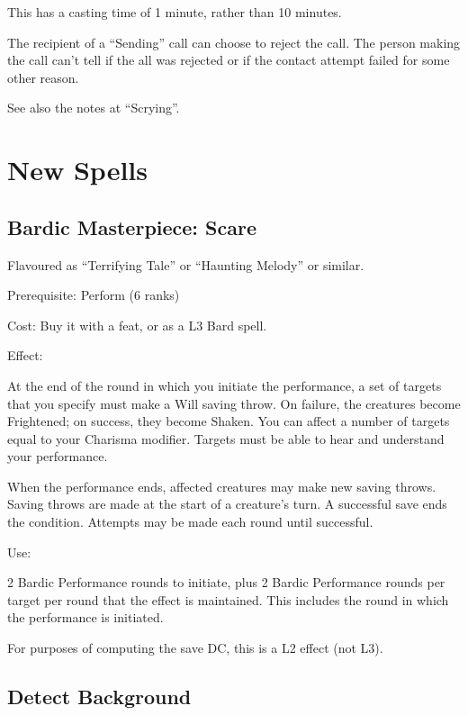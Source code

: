 This has a casting time of 1 minute, rather than 10 minutes.

The recipient of a ``Sending'' call can choose to reject the call. The
person making the call can't tell if the all was rejected or if the
contact attempt failed for some other reason.

See also the notes at ``Scrying''.
%

%
%
\section{New Spells}


%
\subsection{Bardic Masterpiece: Scare}

Flavoured as ``Terrifying Tale'' or ``Haunting Melody'' or similar.

Prerequisite: Perform (6 ranks)

Cost: Buy it with a feat, or as a L3 Bard spell.

Effect:

At the end of the round in which you initiate the performance, a set of
targets that you specify must make a Will saving throw. On failure, the
creatures become Frightened; on success, they become Shaken. You can affect
a number of targets equal to your Charisma modifier. Targets must be able
to hear and understand your performance.

When the performance ends, affected creatures may make new saving throws.
Saving throws are made at the start of a creature's turn. A successful
save ends the condition. Attempts may be made each round until successful.

Use:

2 Bardic Performance rounds to initiate, plus 2 Bardic Performance rounds
per target per round that the effect is maintained. This includes the
round in which the performance is initiated.

For purposes of computing the save DC, this is a L2 effect (not L3).
%

%
\subsection{Detect Background}

